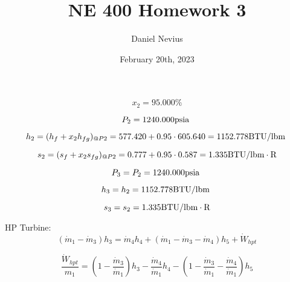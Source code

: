 \documentclass{article}
\title{NE 400 Homework 3}
\author{Daniel Nevius}
\date{February 20th, 2023}
\begin{document}
\maketitle

\section{}

\begin{equation}
x_{ 2} =   95.000\%
\end{equation}

\begin{equation}
P_{ 2} = 1240.000\textnormal{psia                      }
\end{equation}

\begin{equation}
  h_{ 2} = (h_{f} + x_{ 2}h_{fg})_{@P 2} =  577.420 + 0.95\cdot 605.640 = 1152.778
\textnormal{BTU/lbm                   }
\end{equation}

\begin{equation}
  s_{ 2} = (s_{f} + x_{ 2}s_{fg})_{@P 2} =    0.777 + 0.95\cdot   0.587 =    1.335
\textnormal{BTU/lbm}\cdot\textnormal{R}
\end{equation}

\begin{equation}
P_{ 3} = P_{ 2} = 1240.000\textnormal{psia                      }
\end{equation}

\begin{equation}
h_{ 3} = h_{ 2} = 1152.778\textnormal{BTU/lbm                   }
\end{equation}

\begin{equation}
s_{ 3} = s_{ 2} =    1.335\textnormal{BTU/lbm}\cdot\textnormal{R}
\end{equation}


HP Turbine:
\begin{equation}
(\dot{m}_{ 1} - \dot{m}_{ 3})h_{ 3} = \dot{m}_{ 4}h_{ 4} + (\dot{m}_{ 1} - \dot{m}_{ 3} - \dot{m}_{ 4})h_{ 5} + \dot{W}_{hpt}
\end{equation}

\begin{equation}
\frac{\dot{W}_{hpt}}{m_1} = (1 - \frac{\dot{m}_{ 3}}{\dot{m}_{ 1}})h_{ 3} - \frac{\dot{m}_{ 4}}{\dot{m}_{ 1}}h_{ 4} - (1 - \frac{\dot{m}_{ 3}}{\dot{m}_{ 1}} - \frac{\dot{m}_{ 4}}{\dot{m}_{ 1}})h_{ 5}
\end{equation}
\end{document}
